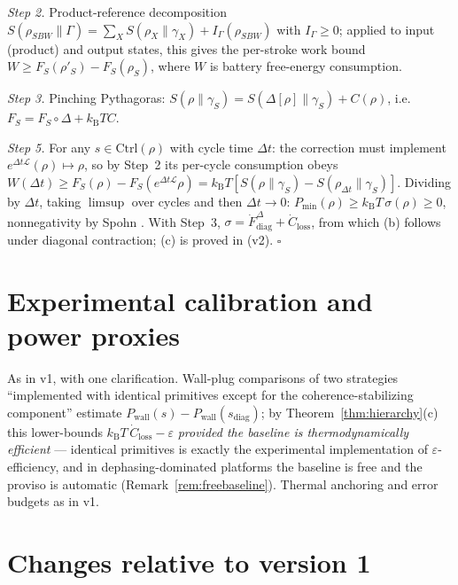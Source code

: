 \documentclass[11pt,a4paper]{article}
\theoremstyle{plain}
\theoremstyle{definition}
\theoremstyle{remark}
\newcommand{\kB}{k_{\mathrm{B}}}
\newcommand{\Ctrl}{\mathrm{Ctrl}}
\newcommand{\Pmin}{P_{\min}}
\newcommand{\Closs}{\dot{C}_{\mathrm{loss}}}
\begin{document}
\emph{Step 2.} Product-reference decomposition
$S(\rho_{SBW}\|\Gamma) = \sum_X S(\rho_X\|\gamma_X) + I_\Gamma(\rho_{SBW})$
with $I_\Gamma \ge 0$; applied to input (product) and output states, this
gives the per-stroke work bound $W \ge F_S(\rho'_S) - F_S(\rho_S)$, where
$W$ is battery free-energy consumption.

\emph{Step 3.} Pinching Pythagoras: $S(\rho\|\gamma_S) =
S(\Delta[\rho]\|\gamma_S) + C(\rho)$, i.e.\ $F_S = F_S\circ\Delta + \kB T C$.

\emph{Step 5.} For any $s \in \Ctrl(\rho)$ with cycle time $\Delta t$: the
correction must implement $e^{\Delta t\mathcal{L}}(\rho) \mapsto \rho$, so by
Step~2 its per-cycle consumption obeys $W(\Delta t) \ge F_S(\rho) -
F_S(e^{\Delta t\mathcal{L}}\rho) = \kB T[S(\rho\|\gamma_S) -
S(\rho_{\Delta t}\|\gamma_S)]$. Dividing by $\Delta t$, taking $\limsup$
over cycles and then $\Delta t \to 0$:
$\Pmin(\rho) \ge \kB T\,\sigma(\rho) \ge 0$, nonnegativity by Spohn
\cite{Spohn78}. With Step~3, $\sigma = \dot{F}^\Delta_{\mathrm{diag}} +
\Closs$, from which (b) follows under diagonal contraction; (c) is proved in
\cite{MaintWork} (v2). \hfill$\square$

\section{Experimental calibration and power proxies}\label{app:calibration}

As in v1, with one clarification. Wall-plug comparisons of two strategies
``implemented with identical primitives except for the coherence-stabilizing
component'' estimate $P_{\mathrm{wall}}(s) - P_{\mathrm{wall}}
(s_{\mathrm{diag}})$; by Theorem~\ref{thm:hierarchy}(c) this lower-bounds
$\kB T\,\Closs - \varepsilon$ \emph{provided the baseline is
thermodynamically efficient} --- identical primitives is exactly the
experimental implementation of $\varepsilon$-efficiency, and in
dephasing-dominated platforms the baseline is free and the proviso is
automatic (Remark~\ref{rem:freebaseline}). Thermal anchoring and error
budgets as in v1.

\section{Changes relative to version 1}
\end{document}
